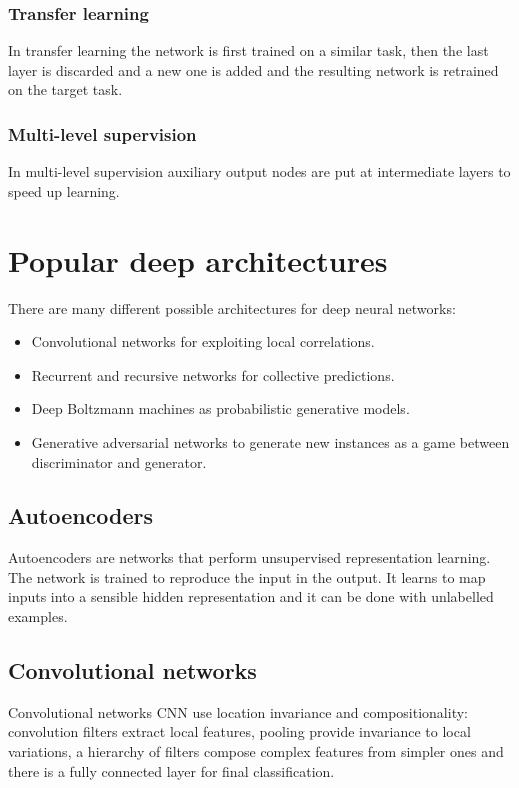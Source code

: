 		\subsubsection{Transfer learning}
		In transfer learning the network is first trained on a similar task, then the last layer is discarded and a new one is added and the resulting network is retrained on the target task.

		\subsubsection{Multi-level supervision}
		In multi-level supervision auxiliary  output nodes are put at intermediate layers to speed up learning.

\section{Popular deep architectures}
There are many different possible architectures for deep neural networks:

\begin{multicols}{2}
	\begin{itemize}
		\item Convolutional networks for exploiting local correlations.
		\item Recurrent and recursive networks for collective predictions.
		\item Deep Boltzmann machines as probabilistic generative models.
		\item Generative adversarial networks to generate new instances as a game between discriminator and generator.
	\end{itemize}
\end{multicols}

	\subsection{Autoencoders}
	Autoencoders are networks that perform unsupervised representation learning.
	The network is trained to reproduce the input in the output.
	It learns to map inputs into a sensible hidden representation and it can be done with unlabelled examples.

	\subsection{Convolutional networks}
	Convolutional networks CNN use location invariance and compositionality: convolution filters extract local features, pooling provide invariance to local variations, a hierarchy of filters compose complex features from simpler ones and there is a fully connected layer for final classification.

